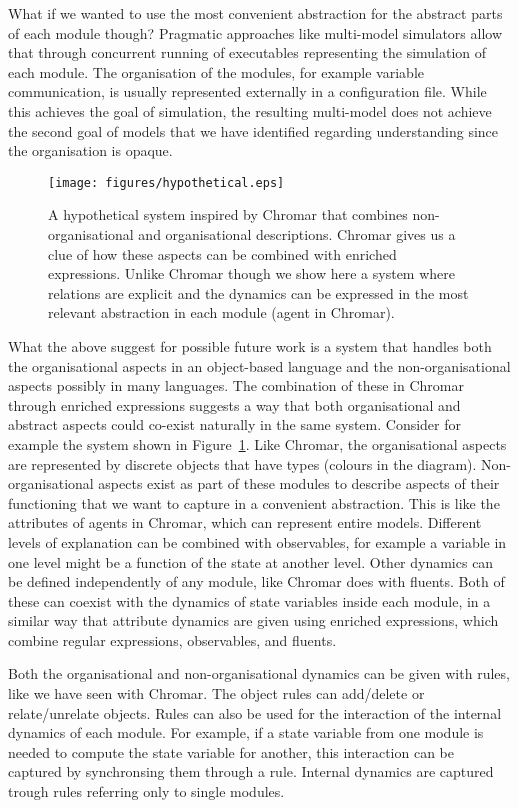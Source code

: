 \documentclass[phd]{infthesis}
\begin{document}
What if we wanted to use the most convenient abstraction for the abstract parts
of each module though? Pragmatic approaches like multi-model simulators
\citep{erbm_mois_2015,cis_2018} allow that through concurrent running of
executables representing the simulation of each module. The organisation of the
modules, for example variable communication, is usually represented externally
in a configuration file. While this achieves the goal of simulation, the
resulting multi-model does not achieve the second goal of models that we have
identified regarding understanding since the organisation is opaque.

\begin{figure}[tb]
  \centering
  \texttt{[image: figures/hypothetical.eps]}
  \caption{A hypothetical system inspired by Chromar that combines
    non-organisational and organisational descriptions. Chromar gives us a clue
    of how these aspects can be combined with enriched expressions. Unlike
    Chromar though we show here a system where relations are explicit and the
    dynamics can be expressed in the most relevant abstraction in each module
    (agent in Chromar).}
    \label{fig:hyp}
\end{figure}

What the above suggest for possible future work is a system that handles both
the organisational aspects in an object-based language and the
non-organisational aspects possibly in many languages. The combination of these
in Chromar through enriched expressions suggests a way that both organisational
and abstract aspects could co-exist naturally in the same system. Consider for
example the system shown in Figure~\ref{fig:hyp}. Like Chromar, the
organisational aspects are represented by discrete objects that have types
(colours in the diagram). Non-organisational aspects exist as part of these
modules to describe aspects of their functioning that we want to capture in a
convenient abstraction. This is like the attributes of agents in Chromar, which
can represent entire models. Different levels of explanation can be combined
with observables, for example a variable in one level might be a function of the
state at another level. Other dynamics can be defined independently of any module,
like Chromar does with fluents. Both of these can coexist with the dynamics of
state variables inside each module, in a similar way that attribute dynamics are
given using enriched expressions, which combine regular expressions,
observables, and fluents.

Both the organisational and non-organisational dynamics can be given with rules,
like we have seen with Chromar. The object rules can add/delete or
relate/unrelate objects. Rules can also be used for the interaction of the
internal dynamics of each module. For example, if a state variable from one
module is needed to compute the state variable for another, this interaction can
be captured by synchronsing them through a rule. Internal dynamics are captured
trough rules referring only to single modules.
\end{document}
